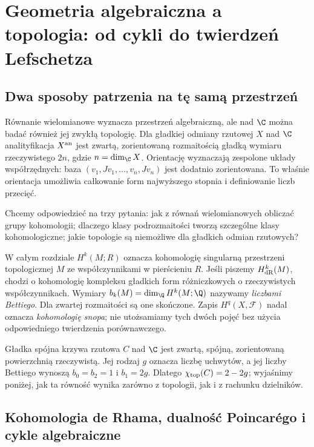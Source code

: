 \chapter{Geometria algebraiczna a topologia: od cykli do twierdzeń Lefschetza}
\label{ch:ga10-topologia}

\providecommand{\atlasref}[2]{#2}


\section{Dwa sposoby patrzenia na tę samą przestrzeń}
\label{sec:ga10-punkt-wyjscia}

Równanie wielomianowe wyznacza przestrzeń algebraiczną, ale nad $\C$
można badać również jej zwykłą topologię. Dla gładkiej odmiany
rzutowej $X$ nad $\C$ analityfikacja $X^{\rm an}$ jest zwartą,
zorientowaną rozmaitością gładką wymiaru rzeczywistego $2n$,
gdzie $n=\dim_{\C}X$. Orientację wyznaczają zespolone układy
współrzędnych: baza $(v_1,Jv_1,\ldots,v_n,Jv_n)$ jest dodatnio
zorientowana. To właśnie orientacja umożliwia całkowanie form
najwyższego stopnia i definiowanie liczb przecięć.

Chcemy odpowiedzieć na trzy pytania: jak z równań wielomianowych
obliczać grupy kohomologii; dlaczego klasy podrozmaitości tworzą
szczególne klasy kohomologiczne; jakie topologie są niemożliwe
dla gładkich odmian rzutowych?

W całym rozdziale $H^k(M;R)$ oznacza kohomologię singularną
przestrzeni topologicznej $M$ ze współczynnikami w pierścieniu $R$.
Jeśli piszemy $H^k_{\rm dR}(M)$, chodzi o kohomologię kompleksu
gładkich form różniczkowych o rzeczywistych współczynnikach.
Wymiary $b_k(M)=\dim_{\Q}H^k(M;\Q)$ nazywamy \emph{liczbami Bettiego}.
Dla zwartej rozmaitości są one skończone. Zapis $H^q(X,\mathcal F)$
nadal oznacza \emph{kohomologię snopa}; nie utożsamiamy tych dwóch
pojęć bez użycia odpowiedniego twierdzenia porównawczego.

\begin{przyklad}
Gładka spójna krzywa rzutowa $C$ nad $\C$ jest zwartą, spójną,
zorientowaną powierzchnią rzeczywistą. Jej rodzaj $g$ oznacza liczbę
uchwytów, a jej liczby Bettiego wynoszą $b_0=b_2=1$ i $b_1=2g$.
Dlatego $\chi_{\rm top}(C)=2-2g$; wyjaśnimy poniżej, jak ta
równość wynika zarówno z topologii, jak i z rachunku dzielników.
\end{przyklad}

\section{Kohomologia de Rhama, dualność Poincarégo i cykle algebraiczne}
\label{sec:ga10-de-rham}

